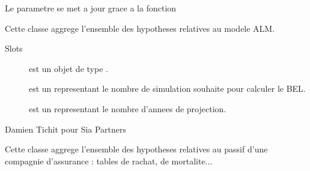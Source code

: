\documentclass[a4paper]{book}
\begin{document}
%
\begin{SeeAlso}\relax
Le parametre  se met a jour grace a la fonction 
\end{SeeAlso}
%
\begin{Description}\relax
Cette classe aggrege l'ensemble des hypotheses relatives au modele ALM.
\end{Description}
%
\begin{Section}{Slots}

\begin{description}

\item[] est un objet de type .

\item[] est un  representant le nombre de simulation souhaite pour calculer le BEL.

\item[] est un  representant le nombre d'annees de projection.

\end{description}
\end{Section}
%
\begin{Author}\relax
Damien Tichit pour Sia Partners
\end{Author}
%
\begin{Description}\relax
Cette classe aggrege l'ensemble des hypotheses relatives au passif d'une compagnie d'assurance : tables de rachat, de mortalite...
\end{Description}
%
\end{document}
